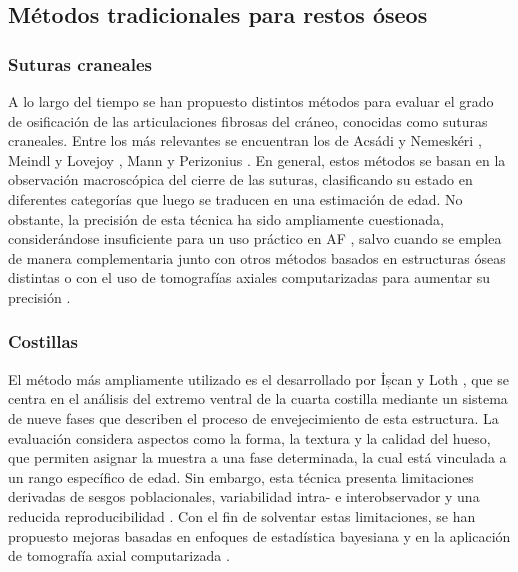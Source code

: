 \subsection{Métodos tradicionales para restos óseos}
\subsubsection{Suturas craneales}
A lo largo del tiempo se han propuesto distintos métodos para evaluar el grado de osificación de las articulaciones fibrosas del cráneo, conocidas como suturas craneales. Entre los más relevantes se encuentran los de Acsádi y Nemeskéri \cite{acsadi1970history}, Meindl y Lovejoy \cite{meindl1985ectocranial}, Mann \cite{mann1991maxillary} y Perizonius \cite{perizonius_closing_1984}. En general, estos métodos se basan en la observación macroscópica del cierre de las suturas, clasificando su estado en diferentes categorías que luego se traducen en una estimación de edad. No obstante, la precisión de esta técnica ha sido ampliamente cuestionada, considerándose insuficiente para un uso práctico en AF \cite{franklin_forensic_2010}, salvo cuando se emplea de manera complementaria junto con otros métodos basados en estructuras óseas distintas o con el uso de tomografías axiales computarizadas para aumentar su precisión \cite{ruengdit2020cranial}.

\subsubsection{Costillas}
El método más ampliamente utilizado es el desarrollado por İșcan y Loth \cite{icscan1984age, icscan1985age}, que se centra en el análisis del extremo ventral de la cuarta costilla mediante un sistema de nueve fases que describen el proceso de envejecimiento de esta estructura. La evaluación considera aspectos como la forma, la textura y la calidad del hueso, que permiten asignar la muestra a una fase determinada, la cual está vinculada a un rango específico de edad. Sin embargo, esta técnica presenta limitaciones derivadas de sesgos poblacionales, variabilidad intra- e interobservador y una reducida reproducibilidad \cite{fanton2010critical, hartnett2010analysis}. Con el fin de solventar estas limitaciones, se han propuesto mejoras basadas en enfoques de estadística bayesiana \cite{munoz_sex_2018} y en la aplicación de tomografía axial computarizada \cite{blaszkowska2019validation}.

